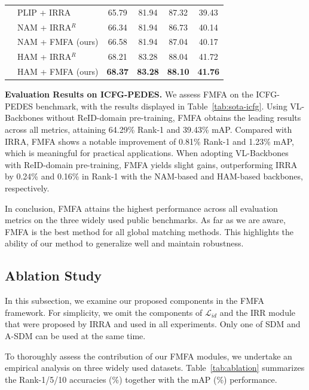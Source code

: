 \documentclass[acmsmall]{acmart}
\begin{document}
\begin{table}[t]
{\begin{tabular}{c|l|cccc}
    & PLIP \cite{zuo2024plip} + IRRA \cite{jiang2023cross} & 65.79 & 81.94 & 87.32 & 39.43 \\
    & NAM \cite{tan2024harnessing} + IRRA$^R$ & 66.34 & 81.94 & 86.73 & 40.14 \\
    & NAM \cite{tan2024harnessing} + FMFA (ours) & 66.58 & 81.94 & 87.04 & 40.17 \\
    & HAM \cite{jiang2025modeling} + IRRA$^R$ & 68.21 & 83.28 & 88.04 & 41.72 \\
    & HAM \cite{jiang2025modeling} + FMFA (ours) & \textbf{68.37} & \textbf{83.28} & \textbf{88.10} & \textbf{41.76} \\
    \hline
  \end{tabular}
  }
\end{table}

{\bfseries Evaluation Results on ICFG-PEDES.} We assess FMFA on the
ICFG-PEDES benchmark, with the results displayed in
Table~\ref{tab:sota-icfg}. Using VL-Backbones without ReID-domain
pre-training, FMFA obtains the leading results across all metrics,
attaining 64.29\% Rank-1 and 39.43\% mAP. Compared with IRRA, FMFA
shows a notable improvement of 0.81\% Rank-1 and 1.23\% mAP, which
is meaningful for practical applications. When adopting VL-Backbones
with ReID-domain pre-training, FMFA yields slight gains,
outperforming IRRA by 0.24\% and 0.16\% in Rank-1 with the NAM-based
and HAM-based backbones, respectively.

In conclusion, FMFA attains the highest performance across all
evaluation metrics on the three widely used public benchmarks. As
far as we are aware, FMFA is the best method for all global matching
methods. This highlights the ability of our method to generalize
well and maintain robustness.

\subsection{Ablation Study}

In this subsection, we examine our proposed components in the FMFA
framework. For simplicity, we omit the components of
$\mathcal{L}_{id}$ and the IRR module that were proposed by IRRA and
used in all experiments. Only one of SDM and A-SDM can be used at
the same time.

To thoroughly assess the contribution of our FMFA modules, we
undertake an empirical analysis on three widely used datasets.
Table~\ref{tab:ablation} summarizes the Rank-1/5/10 accuracies (\%)
together with the mAP (\%) performance.
\end{document}
